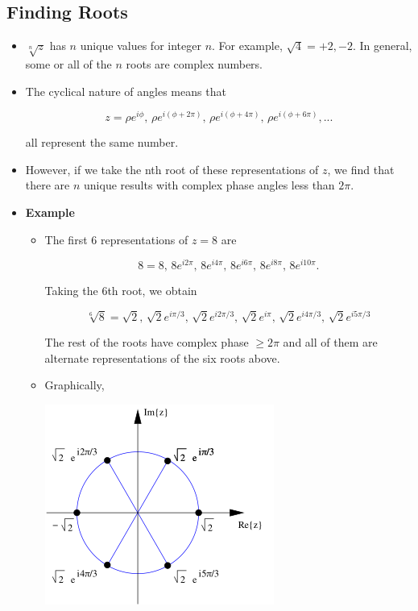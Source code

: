 \documentclass[12pt]{article}
\begin{document}
\subsection*{Finding Roots}
\begin{itemize}
\item $\sqrt[n]{z}$ has $n$ unique values for integer $n$. For
  example, $\sqrt{4} = +2, -2$. In general, some or all of the $n$ roots
  are complex numbers.

\item The cyclical nature of angles means that 

  \begin{equation}
  z = \rho e^{i\phi},\,\rho e^{i(\phi + 2\pi)}, \,\rho e^{i(\phi + 4\pi)}, \,\rho e^{i(\phi + 6\pi)}, ...
  \end{equation}

  \noindent
  all represent the same number.

\item However, if we take the nth root of these representations of
  $z$, we find that there are $n$ unique results with complex phase
  angles less than $2 \pi$.

\item \textbf{Example}
  \begin{itemize}
  \item The first 6 representations of $z=8$ are

    \begin{equation}
      8 = 8, \,8e^{i2\pi}, \,8e^{i4\pi}, 
      \,8e^{i6\pi}, \, 8e^{i8\pi}, \,8e^{i10\pi}.
    \end{equation}

    \noindent
    Taking the 6th root, we obtain

    \begin{equation}
      \sqrt[6]{8} = \sqrt{2}, \,\sqrt{2} e^{i \pi/3}, 
      \,\sqrt{2}  e^{i 2\pi/3}, 
      \,\sqrt{2}  e^{i \pi}, \,\sqrt{2}  e^{i 4\pi/3}, 
      \,\sqrt{2}  e^{i 5\pi/3}
    \end{equation}

    \noindent
    The rest of the roots have complex phase $\geq 2\pi$ and all of them
    are alternate representations of the six roots above. 

  \item Graphically,
    \begin{center}
      \includegraphics{6roots.png}
    \end{center}


\end{itemize}
\end{itemize}
\end{document}
